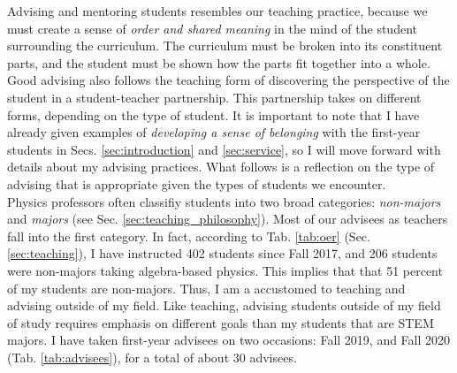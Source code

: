 \documentclass[../../../main.tex]{subfiles}
\begin{document}
Advising and mentoring students resembles our teaching practice, because we must create a sense of \textit{order and shared meaning} in the mind of the student surrounding the curriculum.  The curriculum must be broken into its constituent parts, and the student must be shown how the parts fit together into a whole.  Good advising also follows the teaching form of discovering the perspective of the student in a student-teacher partnership.  This partnership takes on different forms, depending on the type of student.  It is important to note that I have already given examples of \textit{developing a sense of belonging} with the first-year students in Secs. \ref{sec:introduction} and \ref{sec:service}, so I will move forward with details about my advising practices.  What follows is a reflection on the type of advising that is appropriate given the types of students we encounter.
\\
\vspace{0.25cm}
Physics professors often classifiy students into two broad categories: \textit{non-majors} and \textit{majors} (see Sec. \ref{sec:teaching_philosophy}).  Most of our advisees as teachers fall into the first category.  In fact, according to Tab. \ref{tab:oer} (Sec. \ref{sec:teaching}), I have instructed 402 students since Fall 2017, and 206 students were non-majors taking algebra-based physics.  This implies that that 51 percent of my students are non-majors.  Thus, I am a accustomed to teaching and advising outside of my field.  Like teaching, advising students outside of my field of study requires emphasis on different goals than my students that are STEM majors.  I have taken first-year advisees on two occasions: Fall 2019, and Fall 2020 (Tab. \ref{tab:advisees}), for a total of about 30 advisees.
\\
\vspace{0.25cm}
\end{document}
